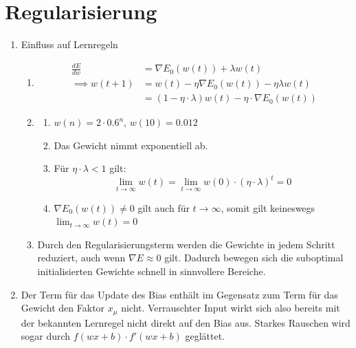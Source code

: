 \documentclass{article}
\begin{document}
\section{Regularisierung}
\begin{enumerate}
  \item Einfluss auf Lernregeln
        \begin{enumerate}[label=\alph*)]
          \item \begin{align*}
                  \frac{dE}{dw}   & =\nabla E_0\left(w(t)\right)+\lambda w(t)                             \\
                  \implies w(t+1) & = w(t) - \eta \nabla E_0\left(w(t)\right)-\eta \lambda w(t)           \\
                                  & =(1-\eta \cdot \lambda) w(t) - \eta \cdot \nabla E_0\left(w(t)\right)
                \end{align*}
          \item \begin{enumerate}[label=\roman*.]
                  \item $w(n) = 2 \cdot 0.6^n$, $w(10)=0.012$
                  \item Das Gewicht nimmt exponentiell ab.
                  \item Für $\eta\cdot\lambda < 1$ gilt:
                        \begin{equation*}
                          \lim_{t\rightarrow \infty} w(t) = \lim_{t\rightarrow \infty} w(0)\cdot (\eta \cdot \lambda)^t = 0
                        \end{equation*}
                  \item
                        $\nabla E_0(w(t))\neq0$ gilt auch für $t\to \infty$, somit gilt keineswegs $\lim_{t\to \infty} w(t)=0$
                \end{enumerate}
                \item Durch den Regularisierungsterm werden die Gewichte in jedem Schritt reduziert, auch wenn $\nabla E \approx 0$ gilt. Dadurch bewegen sich die suboptimal initialisierten Gewichte schnell in sinnvollere Bereiche.
        \end{enumerate}
        \item Der Term für das Update des Bias enthält im Gegensatz zum Term für das Gewicht den Faktor $x_\mu$ nicht. Verrauschter Input wirkt sich also bereits mit der bekannten Lernregel nicht direkt auf den Bias aus.
        Starkes Rauschen wird sogar durch $f(wx + b)\cdot f'(wx + b)$ geglättet.
        

\end{enumerate}
\end{document}
